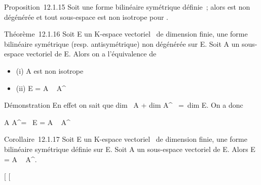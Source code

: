 Proposition~12.1.15 Soit \phi une forme bilinéaire symétrique définie~;
alors \phi est non dégénérée et tout sous-espace est non isotrope pour \phi.

Théorème~12.1.16 Soit E un K-espace vectoriel ~de dimension finie, \phi une
forme bilinéaire symétrique (resp. antisymétrique) non dégénérée sur E.
Soit A un sous-espace vectoriel de E. Alors on a l'équivalence de

\begin{itemize}
\itemsep1pt\parskip0pt
\item
  (i) A est non isotrope
\item
  (ii) E = A \oplus~ A^\bot
\end{itemize}

Démonstration En effet on sait que dim~ A
+ dim A^\bot~ =\
dim E. On a donc

A \bigcap A^\bot = \0\
\Leftrightarrow E = A \oplus~ A^\bot

Corollaire~12.1.17 Soit E un K-espace vectoriel ~de dimension finie, \phi
une forme bilinéaire symétrique définie sur E. Soit A un sous-espace
vectoriel de E. Alors E = A \oplus~ A^\bot.

{[}
{[}
